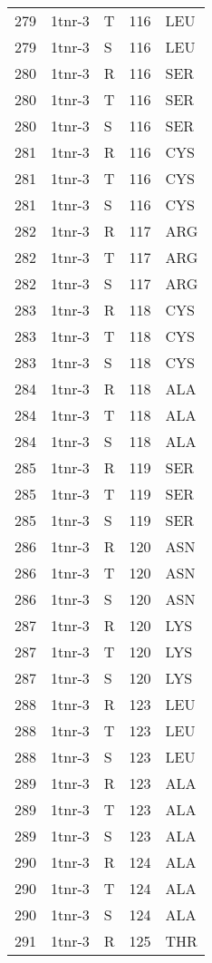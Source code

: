 \begin{longtable}[l]{l|l|l|l|l}
	279 & 1tnr-3 & T & 116 & LEU \\
	279 & 1tnr-3 & S & 116 & LEU \\
	280 & 1tnr-3 & R & 116 & SER \\
	280 & 1tnr-3 & T & 116 & SER \\
	280 & 1tnr-3 & S & 116 & SER \\
	281 & 1tnr-3 & R & 116 & CYS \\
	281 & 1tnr-3 & T & 116 & CYS \\
	281 & 1tnr-3 & S & 116 & CYS \\
	282 & 1tnr-3 & R & 117 & ARG \\
	282 & 1tnr-3 & T & 117 & ARG \\
	282 & 1tnr-3 & S & 117 & ARG \\
	283 & 1tnr-3 & R & 118 & CYS \\
	283 & 1tnr-3 & T & 118 & CYS \\
	283 & 1tnr-3 & S & 118 & CYS \\
	284 & 1tnr-3 & R & 118 & ALA \\
	284 & 1tnr-3 & T & 118 & ALA \\
	284 & 1tnr-3 & S & 118 & ALA \\
	285 & 1tnr-3 & R & 119 & SER \\
	285 & 1tnr-3 & T & 119 & SER \\
	285 & 1tnr-3 & S & 119 & SER \\
	286 & 1tnr-3 & R & 120 & ASN \\
	286 & 1tnr-3 & T & 120 & ASN \\
	286 & 1tnr-3 & S & 120 & ASN \\
	287 & 1tnr-3 & R & 120 & LYS \\
	287 & 1tnr-3 & T & 120 & LYS \\
	287 & 1tnr-3 & S & 120 & LYS \\
	288 & 1tnr-3 & R & 123 & LEU \\
	288 & 1tnr-3 & T & 123 & LEU \\
	288 & 1tnr-3 & S & 123 & LEU \\
	289 & 1tnr-3 & R & 123 & ALA \\
	289 & 1tnr-3 & T & 123 & ALA \\
	289 & 1tnr-3 & S & 123 & ALA \\
	290 & 1tnr-3 & R & 124 & ALA \\
	290 & 1tnr-3 & T & 124 & ALA \\
	290 & 1tnr-3 & S & 124 & ALA \\
	291 & 1tnr-3 & R & 125 & THR \\

\end{longtable}
